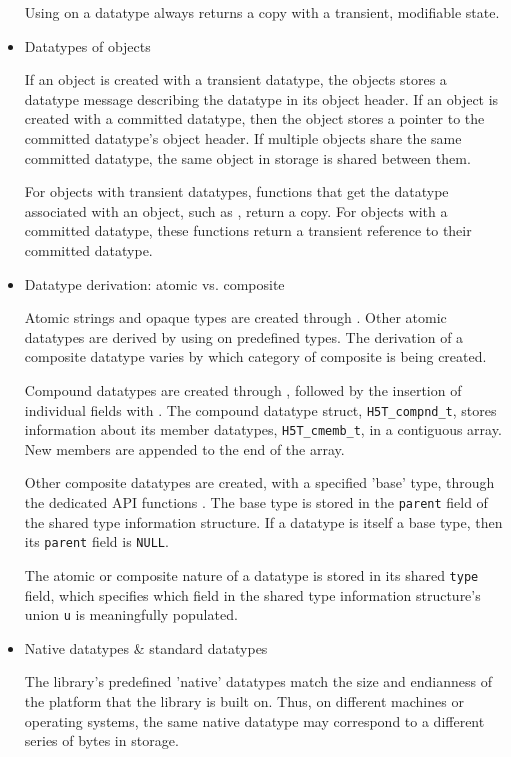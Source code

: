 \begin{itemize}
Using  on a datatype always returns a copy with a transient, modifiable state.

    \item Datatypes of objects

If an object is created with a transient datatype, the objects stores a datatype message describing the datatype in its object header. If an object is created with a committed datatype, then the object stores a pointer to the committed datatype's object header. If multiple objects share the same committed datatype, the same object in storage is shared between them.

For objects with transient datatypes, functions that get the datatype associated with an object, such as , return a copy. For objects with a committed datatype, these functions return a transient reference to their committed datatype.

    \item Datatype derivation: atomic vs. composite

Atomic strings and opaque types are created through . Other atomic datatypes are derived by using  on predefined types. The derivation of a composite datatype varies by which category of composite is being created.

Compound datatypes are created through , followed by the insertion of individual fields with . The compound datatype struct, \texttt{H5T\_compnd\_t}, stores information about its member datatypes, \texttt{H5T\_cmemb\_t}, in a contiguous array. New members are appended to the end of the array. %

Other composite datatypes are created, with a specified 'base' type, through the dedicated API functions . The base type is stored in the \texttt{parent} field of the shared type information structure. If a datatype is itself a base type, then its \texttt{parent} field is \texttt{NULL}.

The atomic or composite nature of a datatype is stored in its shared \texttt{type} field, which specifies which field in the shared type information structure's union \texttt{u} is meaningfully populated.

    \item Native datatypes \& standard datatypes

The library's predefined 'native' datatypes match the size and endianness of the platform that the library is built on. Thus, on different machines or operating systems, the same native datatype may correspond to a different series of bytes in storage.


\end{itemize}
